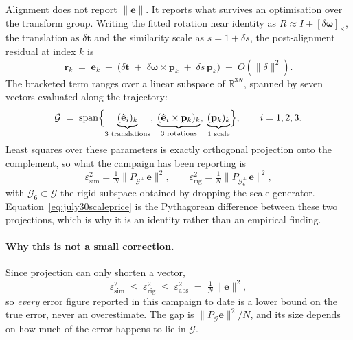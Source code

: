 Alignment does not report $\lVert\mathbf{e}\rVert$. It reports what survives
an optimisation over the transform group. Writing the fitted rotation near
identity as $R \approx I + [\delta\boldsymbol{\omega}]_\times$, the
translation as $\delta\mathbf{t}$ and the similarity scale as
$s = 1 + \delta s$, the post-alignment residual at index $k$ is
\begin{equation}
\mathbf{r}_k \;=\; \mathbf{e}_k
  \;-\;\bigl(\delta\mathbf{t}
  \;+\;\delta\boldsymbol{\omega}\times\mathbf{p}_k
  \;+\;\delta s\,\mathbf{p}_k\bigr) \;+\; O(\lVert\delta\rVert^{2}).
\label{eq:gaugeresidual}
\end{equation}
The bracketed term ranges over a linear subspace of $\mathbb{R}^{3N}$, spanned
by seven vectors evaluated along the trajectory:
\begin{equation}
\mathcal{G} \;=\; \operatorname{span}\Bigl\{
  \underbrace{(\mathbf{\hat e}_i)_k}_{\text{3 translations}},\;
  \underbrace{(\mathbf{\hat e}_i\times\mathbf{p}_k)_k}_{\text{3 rotations}},\;
  \underbrace{(\mathbf{p}_k)_k}_{\text{1 scale}}
  \Bigr\},\qquad i=1,2,3 .
\label{eq:gaugespace}
\end{equation}
Least squares over these parameters is exactly orthogonal projection onto the
complement, so what the campaign has been reporting is
\begin{equation}
\varepsilon^{2}_{\mathrm{sim}}
  = \tfrac{1}{N}\bigl\lVert P_{\mathcal{G}^{\perp}}\,\mathbf{e}\bigr\rVert^{2},
\qquad
\varepsilon^{2}_{\mathrm{rig}}
  = \tfrac{1}{N}\bigl\lVert P_{\mathcal{G}_{6}^{\perp}}\,\mathbf{e}\bigr\rVert^{2},
\label{eq:projected}
\end{equation}
with $\mathcal{G}_6 \subset \mathcal{G}$ the rigid subspace obtained by
dropping the scale generator. Equation~\ref{eq:july30scaleprice} is the
Pythagorean difference between these two projections, which is why it is an
identity rather than an empirical finding.

\paragraph{Why this is not a small correction.}
Since projection can only shorten a vector,
\begin{equation}
\varepsilon^{2}_{\mathrm{sim}} \;\le\;
\varepsilon^{2}_{\mathrm{rig}} \;\le\;
\varepsilon^{2}_{\mathrm{abs}} \;=\; \tfrac{1}{N}\lVert\mathbf{e}\rVert^{2},
\label{eq:lowerbound}
\end{equation}
so \emph{every} error figure reported in this campaign to date is a lower
bound on the true error, never an overestimate. The gap is
$\lVert P_{\mathcal{G}}\mathbf{e}\rVert^{2}/N$, and its size depends on how
much of the error happens to lie in $\mathcal{G}$.

